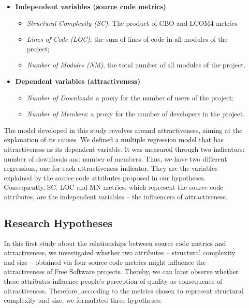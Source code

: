 \documentclass[conference]{IEEEtran}
\begin{document}
\begin{itemize}
\item \textbf{Independent variables (source code metrics)}
%
\begin{itemize}
\item \emph{Structural Complexity (SC)}: The product of CBO and LCOM4 metrics
%
\item \emph{Lines of Code (LOC)}, the sum of lines of code in all modules of the
project;
%
\item \emph{Number of Modules (NM)}, the total number of all modules of the project.
\end{itemize}

\item \textbf{Dependent variables (attractiveness)}
\begin{itemize}
\item \emph{Number of Downloads}: a proxy for the number of users of the
project;
%
\item \emph{Number of Members}: a proxy for the number of developers in the
project.
\end{itemize}
\end{itemize}

The model developed in this study revolves around attractiveness,
aiming at the explanation of its causes.
%
We defined a multiple regression model that has attractiveness as its dependent
variable. 
It was measured through two indicators: number of downloads and number of members. 
Thus, we have two different regressions, one for each attractiveness indicator.
%
They are the variables explained by the source code attributes proposed in our hypotheses.
%
Consequently, SC, LOC and MN metrics, which represent the source code attributes,
are the independent variables -- the influencers of attractiveness.


\subsection{Research Hypotheses} 
\label{hypotheses}

In this first study about the relationships between source code metrics and
attractiveness, we investigated whether two attributes -- structural complexity
and size -- obtained via four source code metrics might influence the attractiveness
of Free Software projects.
%
Thereby, we can later observe whether these attributes influence people's 
perception of quality as consequence of attractiveness.
%
Therefore, according to the metrics chosen to represent structural
complexity and size, we formulated three hypotheses:
\end{document}
